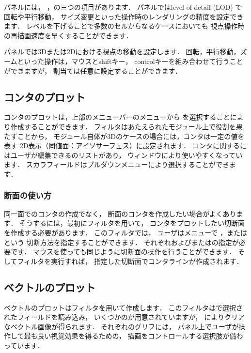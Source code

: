 %
%
パネルには，
，の三つの項目があります．
パネルではlevel of detail (LOD) で回転や平行移動，
サイズ変更といった操作時のレンダリングの精度を設定できます．
レベルを下げることで多数のセルからなるケースにおいても
視点操作時の再描画速度を早くすることができます．

パネルでは3Dまたは2Dにおける視点の移動を設定します．
回転，平行移動，ズームといった操作は，マウスとshiftキー，
controlキーを組み合わせて行うことができますが，
割当ては任意に設定することができます．


\subsection{コンタのプロット}
\label{ssec:6.1.6}
コンタのプロットは，上部のメニューバーのメニューから
を選択することにより作成することができます．
フィルタはあたえられたモジュール上で役割を果たすことから，
モジュール自体が3Dのケースの場合には，コンタは一定の値を表す
2D表示（同値面：アイソサーフェス）に設定されます．
コンタに関するにはユーザが編集できるのリストがあり，
ウィンドウにより使いやすくなっています．
スカラフィールドはプルダウンメニューにより選択することができます．

\subsubsection{断面の使い方}
\label{sssec:6.1.6.1}
同一面でのコンタの作成でなく，
断面のコンタを作成したい場合がよくあります．
そうするには，最初にフィルタを用いて，
コンタをプロットしたい切断面を作成する必要があります．
このフィルタでは，
ユーザはメニューで
，またはという
切断方法を指定することができます．
%
それぞれおよびまたはの指定が必要です．
マウスを使っても同じように切断面の操作を行うことができます．
そしてフィルタを実行すれば，
指定した切断面でコンタラインが作成されます．

\subsection{ベクトルのプロット}
\label{ssec:6.1.7}
ベクトルのプロットはフィルタを用いて作成します．
このフィルタはで選択されたフィールドを読み込み，
いくつかのが用意されていますが，
によりクリアなベクトル画像が得られます．
それぞれのグリフには，
パネル上でユーザが操作して最も良い視覚効果を得るための，
描画をコントロールする選択肢が備わっています．

